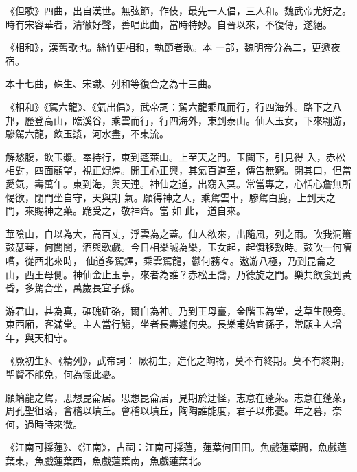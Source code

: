 
\begin{pinyinscope}

 《但歌》四曲，出自漢世。無弦節，作伎，最先一人倡，三人和。魏武帝尤好之。時有宋容華者，清徹好聲，善唱此曲，當時特妙。自晉以來，不復傳，遂絕。



 《相和》，漢舊歌也。絲竹更相和，執節者歌。本
 一部，魏明帝分為二，更遞夜宿。



 本十七曲，硃生、宋識、列和等復合之為十三曲。



 《相和》《駕六龍》、《氣出倡》，武帝詞：駕六龍乘風而行，行四海外。路下之八邦，歷登高山，臨溪谷，乘雲而行，行四海外，東到泰山。仙人玉女，下來翱游，驂駕六龍，飲玉漿，河水盡，不東流。



 解愁腹，飲玉漿。奉持行，東到蓬萊山。上至天之門。玉闕下，引見得
 入，赤松相對，四面顧望，視正焜煌。開王心正興，其氣百道至，傳告無窮。閉其口，但當愛氣，壽萬年。東到海，與天連。神仙之道，出窈入冥。常當專之，心恬心詹無所愒欲，閉門坐自守，天與期
 氣。願得神之人，乘駕雲車，驂駕白鹿，上到天之門，來賜神之藥。跪受之，敬神齊。當
 如
 此，
 道自來。



 華陰山，自以為大，高百丈，浮雲為之蓋。仙人欲來，出隨風，列之雨。吹我洞簫鼓瑟琴，何誾誾，酒與歌戲。今日相樂誠為樂，玉女起，起儛移數時。鼓吹一何嘈嘈，從西北來時，
 仙道多駕煙，乘雲駕龍，鬱何蓩々。遨游八極，乃到昆侖之山，西王母側。神仙金止玉亭，來者為誰？赤松王喬，乃德旋之門。樂共飲食到黃昏，多駕合坐，萬歲長宜子孫。



 游君山，甚為真，磪磈砟硌，爾自為神。乃到王母臺，金階玉為堂，芝草生殿旁。東西廂，客滿堂。主人當行觴，坐者長壽遽何央。長樂甫始宜孫子，常願主人增年，與天相守。



 《厥初生》、《精列》，武帝詞：
 厥初生，造化之陶物，莫不有終期。莫不有終期，聖賢不能免，何為懷此憂。



 願螭龍之駕，思想昆侖居。思想昆侖居，見期於迂怪，志意在蓬萊。志意在蓬萊，周孔聖徂落，會稽以墳丘。會稽以墳丘，陶陶誰能度，君子以弗憂。年之暮，奈何，過時時來微。



 《江南可採蓮》、《江南》，古祠：江南可採蓮，蓮葉何田田。魚戲蓮葉間，魚戲蓮葉東，魚戲蓮葉西，魚戲蓮葉南，魚戲蓮葉北。




\end{pinyinscope}
